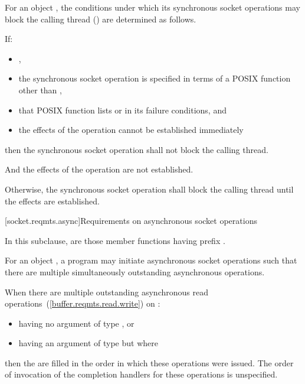 \pnum
For an object , the conditions under which its synchronous socket operations may block the calling thread () are determined as follows.

\pnum
If:

\begin{itemize}
\item
{},
\item
the synchronous socket operation is specified in terms of a POSIX function other than ,
\item
that POSIX function lists  or  in its failure conditions, and
\item
the effects of the operation cannot be established immediately
\end{itemize}

then the synchronous socket operation shall not block the calling thread. \begin{note} And the effects of the operation are not established. \end{note}

\pnum
Otherwise, the synchronous socket operation shall block the calling thread until the effects are established.



[socket.reqmts.async]{Requirements on asynchronous socket operations}

\pnum
In this subclause,  are those member functions having prefix .

\pnum
For an object , a program may initiate asynchronous socket operations such that there are multiple simultaneously outstanding asynchronous operations.

\pnum
When there are multiple outstanding asynchronous read operations~(\ref{buffer.reqmts.read.write}) on :

\begin{itemize}
\item
having no argument  of type , or
\item
having an argument  of type  but where 
\end{itemize}

then the  are filled in the order in which these operations were issued. The order of invocation of the completion handlers for these operations is unspecified.

